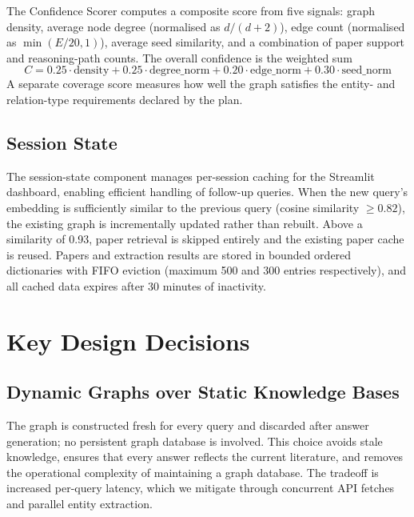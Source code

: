\documentclass[11pt,a4paper]{article}
\begin{document}
The Confidence Scorer computes a composite score from five signals: graph
density, average node degree (normalised as $d/(d+2)$), edge count
(normalised as $\min(E/20, 1)$), average seed similarity, and a combination
of paper support and reasoning-path counts. The overall confidence is the
weighted sum
\[
  C = 0.25 \cdot \text{density} + 0.25 \cdot \text{degree\_norm}
    + 0.20 \cdot \text{edge\_norm} + 0.30 \cdot \text{seed\_norm}
\]
A separate coverage score measures how well the graph satisfies the entity-
and relation-type requirements declared by the plan.

\subsection{Session State}

The session-state component manages per-session caching for the Streamlit
dashboard, enabling efficient handling of follow-up queries. When the new
query's embedding is sufficiently similar to the previous query (cosine
similarity $\geq 0.82$), the existing graph is incrementally updated rather
than rebuilt. Above a similarity of 0.93, paper retrieval is skipped
entirely and the existing paper cache is reused. Papers and extraction
results are stored in bounded ordered dictionaries with FIFO eviction
(maximum 500 and 300 entries respectively), and all cached data expires
after 30 minutes of inactivity.

\section{Key Design Decisions}

\subsection{Dynamic Graphs over Static Knowledge Bases}

The graph is constructed fresh for every query and discarded after answer
generation; no persistent graph database is involved. This choice avoids
stale knowledge, ensures that every answer reflects the current literature,
and removes the operational complexity of maintaining a graph database. The
tradeoff is increased per-query latency, which we mitigate through concurrent
API fetches and parallel entity extraction.
\end{document}
